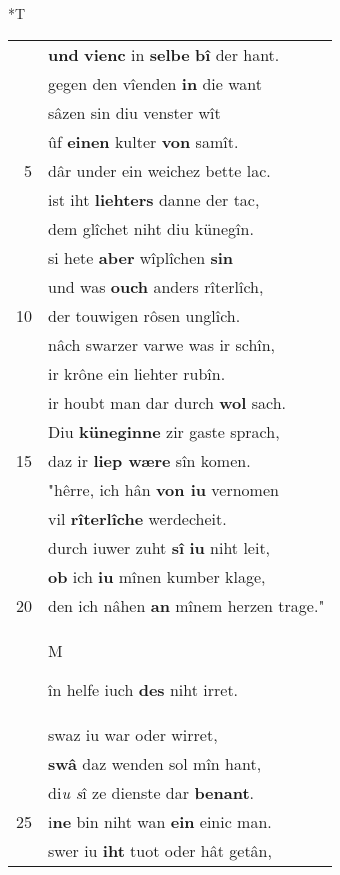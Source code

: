 \documentclass[8pt,a4paper,notitlepage]{article}
\begin{document}
\begin{table}[ht]
\hspace{0.5cm}
\begin{minipage}[t]{0.5\linewidth}
\small
\begin{center}*T
\end{center}
\begin{tabular}{rl}
 & \textbf{und} \textbf{vienc} in \textbf{selbe} \textbf{bî} der hant.\\ 
 & gegen den vîenden \textbf{in} die want\\ 
 & sâzen sin diu venster wît\\ 
 & ûf \textbf{einen} kulter \textbf{von} samît.\\ 
5 & dâr under ein weichez bette lac.\\ 
 & ist iht \textbf{liehters} danne der tac,\\ 
 & dem glîchet niht diu künegîn.\\ 
 & si hete \textbf{aber} wîplîchen \textbf{sin}\\ 
 & und was \textbf{ouch} anders rîterlîch,\\ 
10 & der touwigen rôsen unglîch.\\ 
 & nâch swarzer varwe was ir schîn,\\ 
 & ir krône ein liehter rubîn.\\ 
 & ir houbt man dar durch \textbf{wol} sach.\\ 
 & Diu \textbf{küneginne} zir gaste sprach,\\ 
15 & daz ir \textbf{liep wære} sîn komen.\\ 
 & "hêrre, ich hân \textbf{von iu} vernomen\\ 
 & vil \textbf{rîterlîche} werdecheit.\\ 
 & durch iuwer zuht \textbf{sî} \textbf{iu} niht leit,\\ 
 & \textbf{ob} ich \textbf{iu} mînen kumber klage,\\ 
20 & den ich nâhen \textbf{an} mînem herzen trage."\\ 
 & \begin{large}M\end{large}în helfe iuch \textbf{des} niht irret.\\ 
 & swaz iu war oder wirret,\\ 
 & \textbf{swâ} daz wenden sol mîn hant,\\ 
 & di\textit{u s}î ze dienste dar \textbf{benant}.\\ 
25 & i\textbf{ne} bin niht wan \textbf{ein} einic man.\\ 
 & swer iu \textbf{iht} tuot oder hât getân,\\ 

\end{tabular}
\end{minipage}
\end{table}
\end{document}
